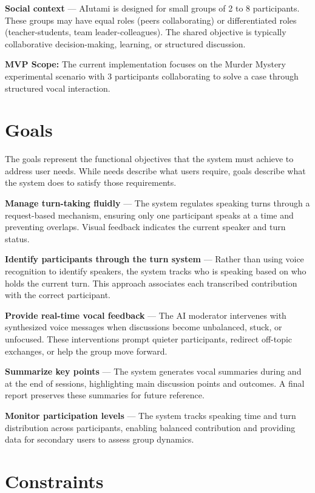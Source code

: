 \textbf{Social context} --- AIutami is designed for small groups of 2 to 8 participants. These groups may have equal roles (peers collaborating) or differentiated roles (teacher-students, team leader-colleagues). The shared objective is typically collaborative decision-making, learning, or structured discussion.

\textbf{MVP Scope:} The current implementation focuses on the Murder Mystery experimental scenario with 3 participants collaborating to solve a case through structured vocal interaction.

\section{Goals}

The goals represent the functional objectives that the system must achieve to address user needs. While needs describe what users require, goals describe what the system does to satisfy those requirements.

\textbf{Manage turn-taking fluidly} --- The system regulates speaking turns through a request-based mechanism, ensuring only one participant speaks at a time and preventing overlaps. Visual feedback indicates the current speaker and turn status.

\textbf{Identify participants through the turn system} --- Rather than using voice recognition to identify speakers, the system tracks who is speaking based on who holds the current turn. This approach associates each transcribed contribution with the correct participant.

\textbf{Provide real-time vocal feedback} --- The AI moderator intervenes with synthesized voice messages when discussions become unbalanced, stuck, or unfocused. These interventions prompt quieter participants, redirect off-topic exchanges, or help the group move forward.

\textbf{Summarize key points} --- The system generates vocal summaries during and at the end of sessions, highlighting main discussion points and outcomes. A final report preserves these summaries for future reference.

\textbf{Monitor participation levels} --- The system tracks speaking time and turn distribution across participants, enabling balanced contribution and providing data for secondary users to assess group dynamics.

\section{Constraints}

